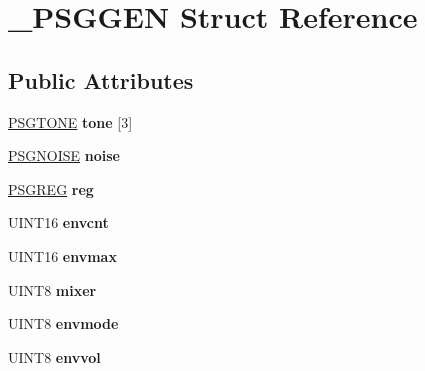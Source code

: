 \hypertarget{struct__PSGGEN}{\section{\-\_\-\-P\-S\-G\-G\-E\-N Struct Reference}
\label{struct__PSGGEN}
}
\subsection*{Public Attributes}
\begin{DoxyCompactItemize}
\item 
\hypertarget{struct__PSGGEN_ac2d74232a0c9185c28201e1ff25a22af}{\hyperlink{structPSGTONE}{P\-S\-G\-T\-O\-N\-E} {\bfseries tone} \mbox{[}3\mbox{]}}\label{struct__PSGGEN_ac2d74232a0c9185c28201e1ff25a22af}

\item 
\hypertarget{struct__PSGGEN_aaefe056d981363dde58f164d8747d35f}{\hyperlink{structPSGNOISE}{P\-S\-G\-N\-O\-I\-S\-E} {\bfseries noise}}\label{struct__PSGGEN_aaefe056d981363dde58f164d8747d35f}

\item 
\hypertarget{struct__PSGGEN_adc215970aff164bed472f92823b13d2c}{\hyperlink{structPSGREG}{P\-S\-G\-R\-E\-G} {\bfseries reg}}\label{struct__PSGGEN_adc215970aff164bed472f92823b13d2c}

\item 
\hypertarget{struct__PSGGEN_a7fd55f217173999c9999fbbaf10f045e}{U\-I\-N\-T16 {\bfseries envcnt}}\label{struct__PSGGEN_a7fd55f217173999c9999fbbaf10f045e}

\item 
\hypertarget{struct__PSGGEN_a0922b687a634055a08f80c9bf724813a}{U\-I\-N\-T16 {\bfseries envmax}}\label{struct__PSGGEN_a0922b687a634055a08f80c9bf724813a}

\item 
\hypertarget{struct__PSGGEN_a5b016b908fc67600a87fa8e146b8cadb}{U\-I\-N\-T8 {\bfseries mixer}}\label{struct__PSGGEN_a5b016b908fc67600a87fa8e146b8cadb}

\item 
\hypertarget{struct__PSGGEN_a0e714d9a17eef5c2a4aab4f52f5089d3}{U\-I\-N\-T8 {\bfseries envmode}}\label{struct__PSGGEN_a0e714d9a17eef5c2a4aab4f52f5089d3}

\item 
\hypertarget{struct__PSGGEN_ade5e9f54f27ea0b9eb05d0863698ae58}{U\-I\-N\-T8 {\bfseries envvol}}\label{struct__PSGGEN_ade5e9f54f27ea0b9eb05d0863698ae58}


\end{DoxyCompactItemize}
